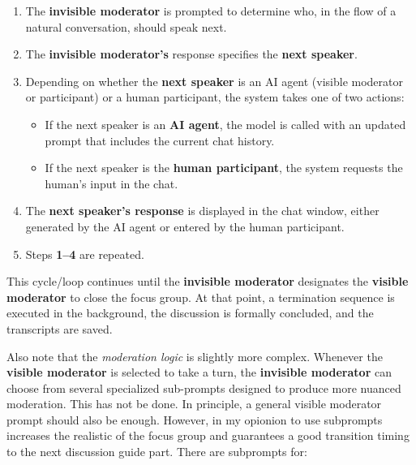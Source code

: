 \documentclass[
  letterpaper,
  DIV=11,
  numbers=noendperiod]{scrartcl}
\providecommand{\tightlist}{%
  \setlength{\itemsep}{0pt}\setlength{\parskip}{0pt}}
\begin{document}
\begin{enumerate}
\def\labelenumi{\arabic{enumi}.}
\item
  The \textbf{invisible moderator} is prompted to determine who, in the
  flow of a natural conversation, should speak next.
\item
  The \textbf{invisible moderator's} response specifies the \textbf{next
  speaker}.
\item
  Depending on whether the \textbf{next speaker} is an AI agent (visible
  moderator or participant) or a human participant, the system takes one
  of two actions:

  \begin{itemize}
  \tightlist
  \item
    If the next speaker is an \textbf{AI agent}, the model is called
    with an updated prompt that includes the current chat history.\\
  \item
    If the next speaker is the \textbf{human participant}, the system
    requests the human's input in the chat.
  \end{itemize}
\item
  The \textbf{next speaker's response} is displayed in the chat window,
  either generated by the AI agent or entered by the human participant.
\item
  Steps \textbf{1--4} are repeated.
\end{enumerate}

This cycle/loop continues until the \textbf{invisible moderator}
designates the \textbf{visible moderator} to close the focus group. At
that point, a termination sequence is executed in the background, the
discussion is formally concluded, and the transcripts are saved.

Also note that the \emph{moderation logic} is slightly more complex.
Whenever the \textbf{visible moderator} is selected to take a turn, the
\textbf{invisible moderator} can choose from several specialized
sub-prompts designed to produce more nuanced moderation. This has not be
done. In principle, a general visible moderator prompt should also be
enough. However, in my opionion to use subprompts increases the
realistic of the focus group and guarantees a good transition timing to
the next discussion guide part. There are subprompts for:
\end{document}
